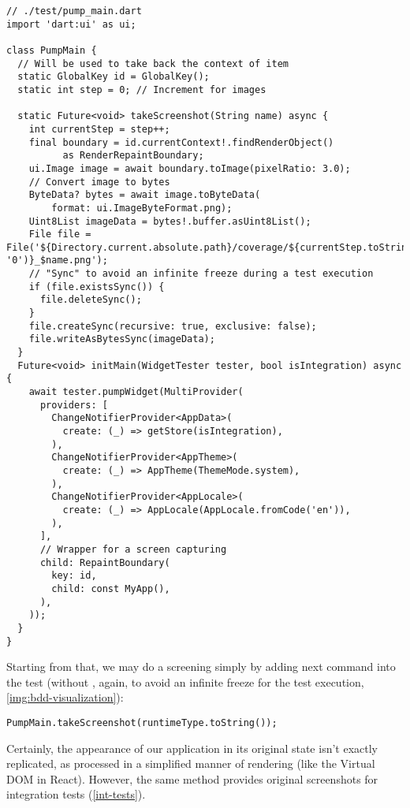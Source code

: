 \begin{lstlisting}
// ./test/pump_main.dart
import 'dart:ui' as ui;

class PumpMain {
  // Will be used to take back the context of item
  static GlobalKey id = GlobalKey();
  static int step = 0; // Increment for images

  static Future<void> takeScreenshot(String name) async {
    int currentStep = step++;
    final boundary = id.currentContext!.findRenderObject() 
          as RenderRepaintBoundary;
    ui.Image image = await boundary.toImage(pixelRatio: 3.0);
    // Convert image to bytes
    ByteData? bytes = await image.toByteData(
        format: ui.ImageByteFormat.png);
    Uint8List imageData = bytes!.buffer.asUint8List();
    File file = File('${Directory.current.absolute.path}/coverage/${currentStep.toString().padLeft(8, '0')}_$name.png');
    // "Sync" to avoid an infinite freeze during a test execution
    if (file.existsSync()) {
      file.deleteSync();
    }
    file.createSync(recursive: true, exclusive: false);
    file.writeAsBytesSync(imageData);
  }
  Future<void> initMain(WidgetTester tester, bool isIntegration) async {
    await tester.pumpWidget(MultiProvider(
      providers: [
        ChangeNotifierProvider<AppData>(
          create: (_) => getStore(isIntegration),
        ),
        ChangeNotifierProvider<AppTheme>(
          create: (_) => AppTheme(ThemeMode.system),
        ),
        ChangeNotifierProvider<AppLocale>(
          create: (_) => AppLocale(AppLocale.fromCode('en')),
        ),
      ],
      // Wrapper for a screen capturing
      child: RepaintBoundary(
        key: id,
        child: const MyApp(),
      ),
    ));
  }
}
\end{lstlisting}

\noindent Starting from that, we may do a screening simply by adding next command into the test (without , 
again, to avoid an infinite freeze for the test execution, \cref{img:bdd-visualization}):

\begin{lstlisting}[language=terminal]
PumpMain.takeScreenshot(runtimeType.toString());
\end{lstlisting}  


\noindent Certainly, the appearance of our application in its original state isn't exactly replicated, as processed in a 
simplified manner of rendering (like the Virtual DOM in React). However, the same method provides original screenshots 
for integration tests (\cref{int-tests}).


